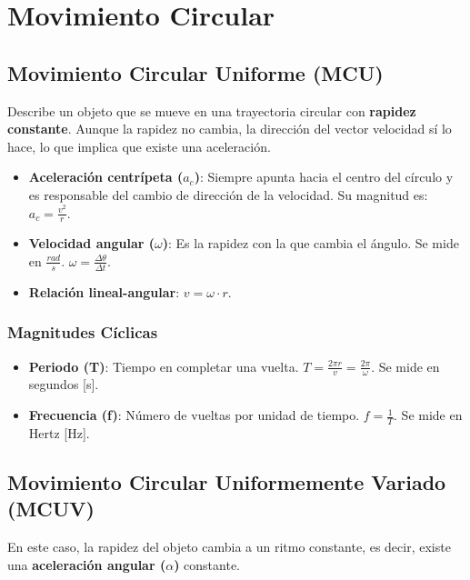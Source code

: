 \documentclass[11pt]{article}
\begin{document}
\newpage

\section{Movimiento Circular}
\label{sec:mov_circular}

\subsection{Movimiento Circular Uniforme (MCU)}
Describe un objeto que se mueve en una trayectoria circular con \textbf{rapidez constante}. Aunque la rapidez no cambia, la dirección del vector velocidad sí lo hace, lo que implica que existe una aceleración.

\begin{itemize}
	\item \textbf{Aceleración centrípeta ($a_c$)}: Siempre apunta hacia el centro del círculo y es responsable del cambio de dirección de la velocidad. Su magnitud es: $a_c = \frac{v^2}{r}$.
	\item \textbf{Velocidad angular ($\omega$)}: Es la rapidez con la que cambia el ángulo. Se mide en $\frac{rad}{s}$. $\omega = \frac{\Delta \theta}{\Delta t}$.
	\item \textbf{Relación lineal-angular}: $v = \omega \cdot r$.
\end{itemize}

\subsubsection{Magnitudes Cíclicas}
\begin{itemize}
	\item \textbf{Periodo (T)}: Tiempo en completar una vuelta. $T = \frac{2\pi r}{v} = \frac{2\pi}{\omega}$. Se mide en segundos [s].
	\item \textbf{Frecuencia (f)}: Número de vueltas por unidad de tiempo. $f = \frac{1}{T}$. Se mide en Hertz [Hz].
\end{itemize}

\subsection{Movimiento Circular Uniformemente Variado (MCUV)}
En este caso, la rapidez del objeto cambia a un ritmo constante, es decir, existe una \textbf{aceleración angular ($\alpha$)} constante.
\end{document}
